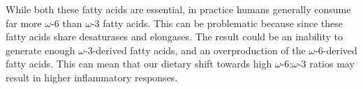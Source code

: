 \documentclass{tufte-handout}
\begin{document}
  While both these fatty acids are essential, in practice humans generally consume far more $\omega$-6  than $\omega$-3 fatty acids.  This can be problematic because since these fatty acids share desaturases and elongases.  The result could be an inability to generate enough $\omega$-3-derived fatty acids, and an overproduction of the $\omega$-6-derived fatty acids.  This can mean that our dietary shift towards high $\omega$-6:$\omega$-3 ratios may result in higher inflammatory responses.



\end{document}
